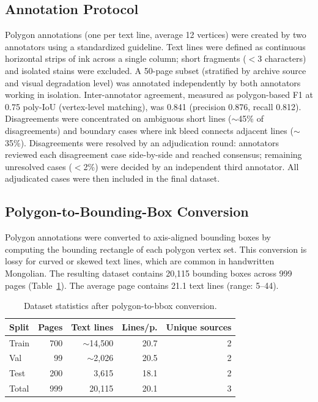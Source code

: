 \documentclass[pdflatex,sn-mathphys-num]{sn-jnl}
\begin{document}
\subsection{Annotation Protocol}
Polygon annotations (one per text line, average 12 vertices) were created by two annotators using a standardized guideline. Text lines were defined as continuous horizontal strips of ink across a single column; short fragments ($<$3 characters) and isolated stains were excluded. A 50-page subset (stratified by archive source and visual degradation level) was annotated independently by both annotators working in isolation. Inter-annotator agreement, measured as polygon-based F1 at 0.75 poly-IoU (vertex-level matching), was 0.841 (precision 0.876, recall 0.812). Disagreements were concentrated on ambiguous short lines ($\sim$45\% of disagreements) and boundary cases where ink bleed connects adjacent lines ($\sim$35\%). Disagreements were resolved by an adjudication round: annotators reviewed each disagreement case side-by-side and reached consensus; remaining unresolved cases ($<$2\%) were decided by an independent third annotator. All adjudicated cases were then included in the final dataset.

\subsection{Polygon-to-Bounding-Box Conversion}
Polygon annotations were converted to axis-aligned bounding boxes by computing the bounding rectangle of each polygon vertex set. This conversion is lossy for curved or skewed text lines, which are common in handwritten Mongolian. The resulting dataset contains 20,115 bounding boxes across 999 pages (Table~\ref{tab:data}). The average page contains 21.1 text lines (range: 5--44).

\begin{table}[t]
\centering
\scriptsize\setlength{\tabcolsep}{3pt}
\caption{Dataset statistics after polygon-to-bbox conversion.}
\label{tab:data}
\begin{tabular}{lrrrr}
\toprule
Split & Pages & Text lines & Lines/p. & Unique sources \\
\midrule
Train  & 700 & $\sim$14,500 & 20.7 & 2 \\
Val    &  99 & $\sim$2,026  & 20.5 & 2 \\
Test   & 200 & 3,615        & 18.1 & 2 \\
\midrule
Total  & 999 & 20,115       & 20.1 & 3 \\
\bottomrule
\end{tabular}
\end{table}
\end{document}
